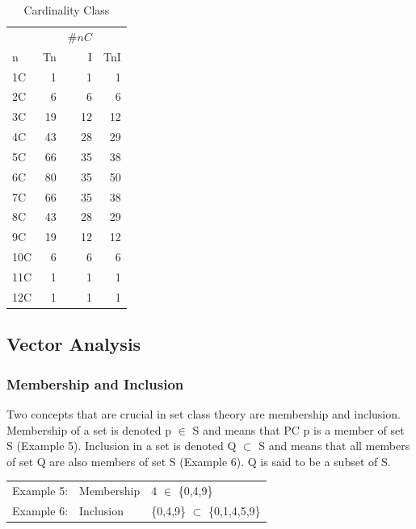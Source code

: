 \documentclass{article}
\begin{document}
\begin{table}[htb]
\caption{Cardinality Class} 
\begin{center}
\begin{tabular}{lrrr}
      &      &  $\#nC$  &       \\
 n    &  Tn  &       I  &  TnI  \\
\hline
 1C   &   1  &       1  &    1  \\
 2C   &   6  &       6  &    6  \\
 3C   &  19  &      12  &   12  \\
 4C   &  43  &      28  &   29  \\
 5C   &  66  &      35  &   38  \\
 6C   &  80  &      35  &   50  \\
 7C   &  66  &      35  &   38  \\
 8C   &  43  &      28  &   29  \\
 9C   &  19  &      12  &   12  \\
 10C  &   6  &       6  &    6  \\
 11C  &   1  &       1  &    1  \\
 12C  &   1  &       1  &    1  \\
\end{tabular}
\end{center}
\end{table}
\subsection{Vector Analysis}
\label{sec-3-3}
\subsubsection{Membership and Inclusion}
\label{sec-3-3-1}

Two concepts that are crucial in set class theory are membership and
inclusion. Membership of a set is denoted p $\in$ S and means that PC p
is a member of set S (Example 5). Inclusion in a set is denoted Q
$\subset$ S and means that all members of set Q are also members of set
S (Example 6). Q is said to be a subset of S.

\begin{center}
\begin{tabular}{lll}
 Example 5:  &  Membership  &  4 $\in$ \{0,4,9\}                  \\
 Example 6:  &  Inclusion   &  \{0,4,9\} $\subset$ \{0,1,4,5,9\}  \\
\end{tabular}
\end{center}
\end{document}
